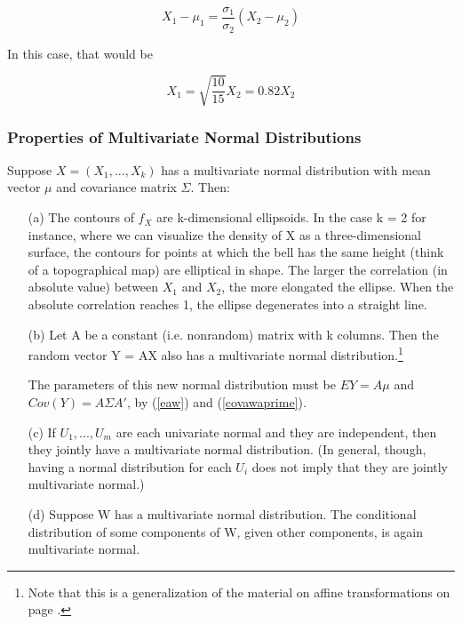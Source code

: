 \begin{equation}
X_1 - \mu_1 = \frac{\sigma_1}{\sigma_2} (X_2 - \mu_2)
\end{equation}

In this case, that would be

\begin{equation}
X_1 = \sqrt{\frac{10}{15}} X_2 = 0.82 X_2
\end{equation}

\subsubsection{Properties of Multivariate Normal Distributions}
\label{mvnormproperties}

\begin{theorem}
\label{mvnormtheorem}

Suppose $X = (X_1,...,X_k)$ has a multivariate normal distribution with
mean vector $\mu$ and covariance matrix $\Sigma$.  Then:

\begin{itemize}

\item [(a)] The contours of $f_X$ are k-dimensional ellipsoids.  In the
case k = 2 for instance, where we can visualize the density of X as a
three-dimensional surface, the contours for points at which the bell has
the same height (think of a topographical map) are elliptical in shape.
The larger the correlation (in absolute value) between $X_1$ and $X_2$,
the more elongated the ellipse.  When the absolute correlation reaches
1, the ellipse degenerates into a straight line.

\item [(b)] Let A be a constant (i.e. nonrandom) matrix with k columns.
Then the random vector Y = AX also has a multivariate normal
distribution.\footnote{Note that this is a generalization of the
material on affine transformations on page \pageref{affine}.} 

The parameters of this new normal distribution must be $EY = A \mu$ 
and $Cov(Y) = A \Sigma A'$,  by (\ref{eaw}) and (\ref{covawaprime}).
   
\item [(c)] If $U_1,...,U_m$ are each univariate normal and they are
independent, then they jointly have a multivariate normal distribution.
(In general, though, having a normal distribution for each $U_i$ does
not imply that they are jointly multivariate normal.)  

\item [(d)] Suppose W has a multivariate normal distribution.  The
conditional distribution of some components of W, given other
components, is again multivariate normal.

\end{itemize}

\end{theorem}

